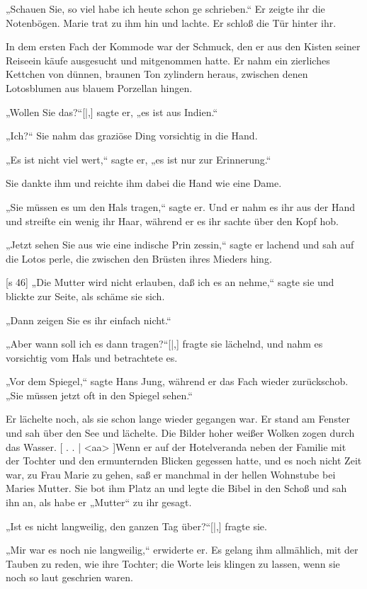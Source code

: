 „Schauen Sie, so viel habe ich heute schon ge­
schrieben.“ Er zeigte ihr die Notenbögen. Marie trat
zu ihm hin und lachte. Er schloß die Tür hinter ihr.

In dem ersten Fach der Kommode war der
Schmuck, den er aus den Kisten seiner Reiseein­
käufe ausgesucht und mitgenommen hatte. Er nahm
ein zierliches Kettchen von dünnen, braunen Ton­
zylindern heraus, zwischen denen Lotosblumen aus
blauem Porzellan hingen.

„Wollen Sie das?“[|,] sagte er, „es ist aus Indien.“

„Ich?“ Sie nahm das graziöse Ding vorsichtig
in die Hand.

„Es ist nicht viel wert,“ sagte er, „es ist nur
zur Erinnerung.“

Sie dankte ihm und reichte ihm dabei die Hand
wie eine Dame.

„Sie müssen es um den Hals tragen,“ sagte er.
Und er nahm es ihr aus der Hand und streifte ein
wenig ihr Haar, während er es ihr sachte über den
Kopf hob.

„Jetzt sehen Sie aus wie eine indische Prin­
zessin,“ sagte er lachend und sah auf die Lotos­
perle, die zwischen den Brüsten ihres Mieders hing.

[s 46]
„Die Mutter wird nicht erlauben, daß ich es an­
nehme,“ sagte sie und blickte zur Seite, als schäme sie sich.

„Dann zeigen Sie es ihr einfach nicht.“

„Aber wann soll ich es dann tragen?“[|,] fragte
sie lächelnd, und nahm es vorsichtig vom Hals und
betrachtete es.

„Vor dem Spiegel,“ sagte Hans Jung, während
er das Fach wieder zurückschob. „Sie müssen jetzt
oft in den Spiegel sehen.“

Er lächelte noch, als sie schon lange wieder
gegangen war. Er stand am Fenster und sah über
den See und lächelte. Die Bilder hoher weißer
Wolken zogen durch das Wasser.
[
. . |
<aa>
]Wenn er auf der Hotelveranda neben der
Familie mit der Tochter und den ermunternden
Blicken gegessen hatte, und es noch nicht Zeit war,
zu Frau Marie zu gehen, saß er manchmal in der
hellen Wohnstube bei Maries Mutter. Sie bot ihm
Platz an und legte die Bibel in den Schoß und sah
ihn an, als habe er „Mutter“ zu ihr gesagt.

„Ist es nicht langweilig, den ganzen Tag über?“[|,]
fragte sie.

„Mir war es noch nie langweilig,“ erwiderte er.
Es gelang ihm allmählich, mit der Tauben zu reden,
wie ihre Tochter; die Worte leis klingen zu lassen,
wenn sie noch so laut geschrien waren.

